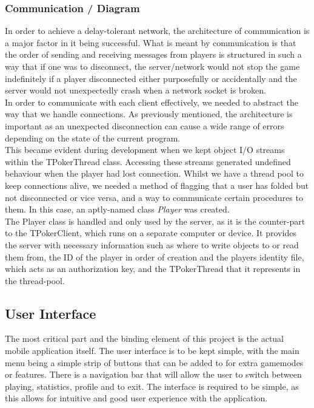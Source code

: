 \documentclass[11pt]{article}
\begin{document}
\subsubsection{Communication / Diagram} %
In order to achieve a delay-tolerant network, the architecture of communication is a major factor in it being successful. What is meant by communication is that the order of sending and receiving messages from players is structured in such a way that if one was to disconnect, the server/network would not stop the game indefinitely if a player disconnected either purposefully or accidentally and the server would not unexpectedly crash when a network socket is broken. \\

In order to communicate with each client effectively, we needed to abstract the way that we handle connections. As previously mentioned, the architecture is important as an unexpected disconnection can cause a wide range of errors depending on the state of the current program. \\ %

This became evident during development when we kept object I/O streams within the TPokerThread class. Accessing these streams generated undefined behaviour when the player had lost connection. Whilst we have a thread pool to keep connections alive, we needed a method of flagging that a user has folded but not disconnected or vice versa, and a way to communicate certain procedures to them. In this case, an aptly-named class \textit{Player} was created. \\

The Player class is handled and only used by the server, as it is the counter-part to the TPokerClient, which runs on a separate computer or device. It provides the server with necessary information such as where to write objects to or read them from, the ID of the player in order of creation and the players identity file, which acts as an authorization key, and the TPokerThread that it represents in the thread-pool. \\



\newpage
\subsection{User Interface}

The most critical part and the binding element of this project is the actual mobile application itself. The user interface is to be kept simple, with the main menu being a simple strip of buttons that can be added to for extra gamemodes or features. There is a navigation bar that will allow the user to switch between playing, statistics, profile and to exit. 
The interface is required to be simple, as this allows for intuitive and good user experience with the application. \\
\end{document}

